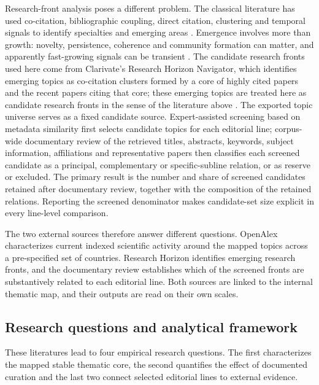 \documentclass[futureinternet,article,submit,moreauthors]{Definitions/mdpi}
\begin{document}
Research-front analysis poses a different problem. The classical literature has used co-citation, bibliographic coupling, direct citation, clustering and temporal signals to identify specialties and emerging areas \citep{boyack2010front,small2014emerging}. Emergence involves more than growth: novelty, persistence, coherence and community formation can matter, and apparently fast-growing signals can be transient \citep{rotolo2015emerging}. The candidate research fronts used here come from Clarivate's Research Horizon Navigator, which identifies emerging topics as co-citation clusters formed by a core of highly cited papers and the recent papers citing that core; these emerging topics are treated here as candidate research fronts in the sense of the literature above \citep{boyack2010front,small2014emerging}. The exported topic universe serves as a fixed candidate source. Expert-assisted screening based on metadata similarity first selects candidate topics for each editorial line; corpus-wide documentary review of the retrieved titles, abstracts, keywords, subject information, affiliations and representative papers then classifies each screened candidate as a principal, complementary or specific-subline relation, or as reserve or excluded. The primary result is the number and share of screened candidates retained after documentary review, together with the composition of the retained relations. Reporting the screened denominator makes candidate-set size explicit in every line-level comparison.

The two external sources therefore answer different questions. OpenAlex characterizes current indexed scientific activity around the mapped topics across a pre-specified set of countries. Research Horizon identifies emerging research fronts, and the documentary review establishes which of the screened fronts are substantively related to each editorial line. Both sources are linked to the internal thematic map, and their outputs are read on their own scales.

\subsection{Research questions and analytical framework}\label{subsec:rqs}

These literatures lead to four empirical research questions. The first characterizes the mapped stable thematic core, the second quantifies the effect of documented curation and the last two connect selected editorial lines to external evidence.
\end{document}
